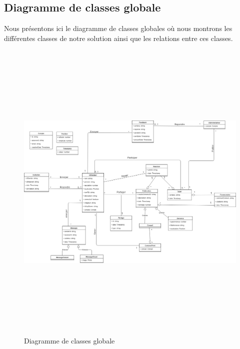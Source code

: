 \documentclass[11pt,a4paper,oneside]{book}
\begin{document}
					\subsection{Diagramme de classes globale}
					Nous présentons ici le diagramme de classes globales où nous montrons les différentes classes de notre solution ainsi que les relations entre ces classes.
					\begin{figure}[H]
						\centering
						\includegraphics[width=16cm, height=15cm]{Images/ch3/classeGlobale1}
						\caption{Diagramme de classes globale}
						\label{fig:classeglobale}
					\end{figure}
				\vfill
\end{document}

